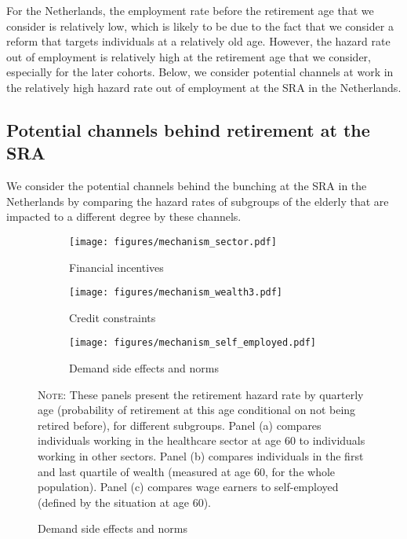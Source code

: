 \documentclass[12pt,a4paper]{article}
\begin{document}
For the Netherlands, the employment rate before the retirement age that we consider is relatively low, which is likely to be due to the fact that we consider a reform that targets individuals at a relatively old age. However, the hazard rate out of employment is relatively high at the retirement age that we consider, especially for the later cohorts. Below, we consider potential channels at work in the relatively high hazard rate out of employment at the SRA in the Netherlands. 

\subsection{Potential channels behind retirement at the SRA}

We consider the potential channels behind the bunching at the SRA in the Netherlands by comparing the hazard rates of subgroups of the elderly that are impacted to a different degree by these channels.

\begin{figure}[p]
	
	\begin{adjustwidth}{-1.1in}{-1in}
		
	\caption{Determinants of bunching at the SRA}
	\label{channels}
	\centering
	\begin{subfigure}{0.65\textwidth}
		\centering
		\caption{Financial incentives}
		\texttt{[image: figures/mechanism\_sector.pdf]} %
		\label{channel_sector}
		\vspace*{0.3cm}
	\end{subfigure}
	\begin{subfigure}{0.65\textwidth}
		\centering
		\caption{Credit constraints}
		\texttt{[image: figures/mechanism\_wealth3.pdf]} 	
		\label{channel_credit}
	\vspace*{0.3cm}
	\end{subfigure}
	\begin{subfigure}{0.65\textwidth}
	\centering
	\caption{Demand side effects and norms}
	\texttt{[image: figures/mechanism\_self\_employed.pdf]}
	\label{channel_norm}
\end{subfigure}
	\begin{minipage}{15cm}%
		\footnotesize
		\small \textsc{Note:} These panels present the retirement hazard rate by quarterly age (probability of retirement at this age conditional on not being retired before), for different subgroups. Panel (a) compares individuals working in the healthcare sector at age 60 to individuals working in other sectors. Panel (b) compares individuals in the first and last quartile of wealth (measured at age 60, for the whole population). Panel (c) compares wage earners to self-employed (defined by the situation at age 60).
	\end{minipage}%

\end{adjustwidth}

\end{figure}
\end{document}
